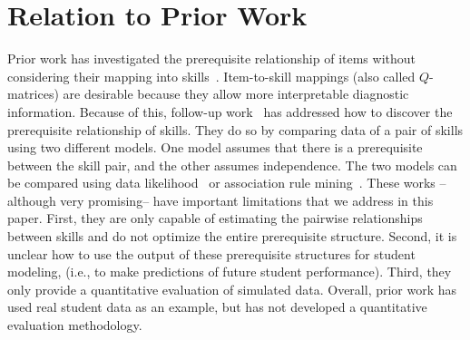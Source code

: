 \documentclass{edm_template}
\begin{document}
\section{Relation to Prior Work}
\label{sec:previous_work}

Prior work has investigated %
the prerequisite relationship of items without considering their mapping into skills~\cite{desmarais2006learned,vuong2010method}. %
Item-to-skill mappings (also called $Q$-matrices) are desirable because they allow more interpretable diagnostic information.
Because of this, follow-up work~\cite{brunskill2010estimating,chen2015discovering}  has addressed how to discover the prerequisite relationship of skills.
They do so by comparing data of a pair of skills using  two different models.
One model assumes that there is a prerequisite between the skill pair, and the other  assumes  independence.
The two models can be compared using data likelihood~\cite{brunskill2010estimating} or  association rule mining~\cite{chen2015discovering}.
These works --although very promising--   have important limitations that we address in this paper.
First,  they are only capable of estimating the pairwise relationships between skills and do not optimize the entire prerequisite structure.
Second, it is unclear how to use the output of these prerequisite structures for student modeling, (i.e., to make predictions of future student performance).
Third, they only provide a quantitative evaluation of simulated data.
Overall, prior work has used real student data as an example, but has not developed a quantitative evaluation methodology.
\end{document}
